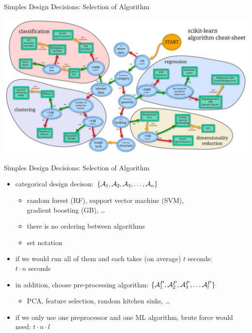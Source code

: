 \begin{frame}[c]{Simples Design Decisions: Selection of Algorithm}

\includegraphics[width=1.0\textwidth]{images/sklearn-cheat}


\end{frame}
\begin{frame}[c]{Simples Design Decisions: Selection of Algorithm}

\begin{itemize}
  \item categorical design decison: $\{ \mathcal{A}_1, \mathcal{A}_2, \mathcal{A}_3, \ldots, \mathcal{A}_n\}$
  \begin{itemize}
	\item random forest (RF), support vector machine (SVM),\\ gradient boosting (GB), \ldots
    \item there is no ordering between algorithms
    \item set notation
  \end{itemize}
  \pause
  \item if we would run all of them and each takes (on average) $t$ seconds:\\
  $t \cdot n$ seconds
  \pause
  \smallskip
  \item in addition, choose pre-processing algorithm: $\{\mathcal{A}_1^P, \mathcal{A}_2^P, \mathcal{A}_3^P, \ldots \mathcal{A}_l^P \}$
  \begin{itemize}
    \item PCA, feature selection, random kitchen sinks, \ldots
  \end{itemize}
  \item if we only use one preprocessor and one ML algorithm, brute force would need:
  $t \cdot n \cdot l$
\end{itemize}

\end{frame}
